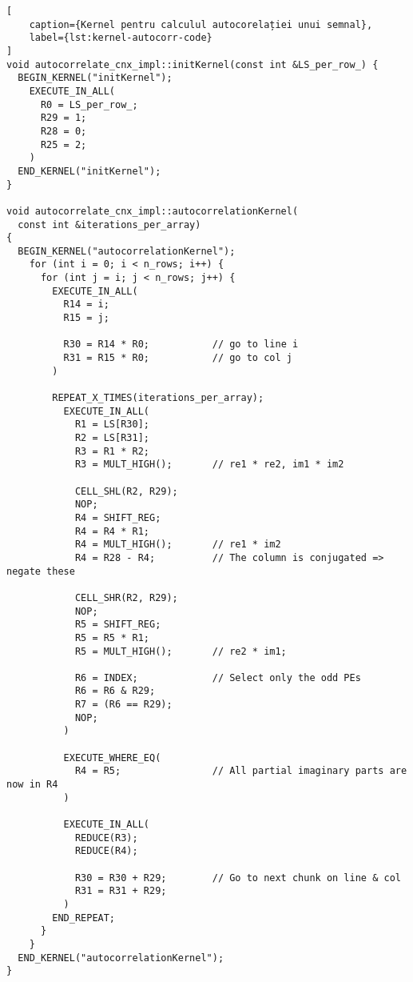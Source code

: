 \begin{lstlisting}[
    caption={Kernel pentru calculul autocorelației unui semnal},
    label={lst:kernel-autocorr-code}
]
void autocorrelate_cnx_impl::initKernel(const int &LS_per_row_) {
  BEGIN_KERNEL("initKernel");
    EXECUTE_IN_ALL(
      R0 = LS_per_row_;
      R29 = 1;
      R28 = 0;
      R25 = 2;
    )
  END_KERNEL("initKernel");
}

void autocorrelate_cnx_impl::autocorrelationKernel(
  const int &iterations_per_array)
{
  BEGIN_KERNEL("autocorrelationKernel");
    for (int i = 0; i < n_rows; i++) {
      for (int j = i; j < n_rows; j++) {
        EXECUTE_IN_ALL(
          R14 = i;
          R15 = j;

          R30 = R14 * R0;           // go to line i
          R31 = R15 * R0;           // go to col j
        )

        REPEAT_X_TIMES(iterations_per_array);
          EXECUTE_IN_ALL(
            R1 = LS[R30];
            R2 = LS[R31];
            R3 = R1 * R2;
            R3 = MULT_HIGH();       // re1 * re2, im1 * im2

            CELL_SHL(R2, R29);
            NOP;
            R4 = SHIFT_REG;
            R4 = R4 * R1;
            R4 = MULT_HIGH();       // re1 * im2
            R4 = R28 - R4;          // The column is conjugated => negate these

            CELL_SHR(R2, R29);
            NOP;
            R5 = SHIFT_REG;
            R5 = R5 * R1;
            R5 = MULT_HIGH();       // re2 * im1;

            R6 = INDEX;             // Select only the odd PEs
            R6 = R6 & R29;
            R7 = (R6 == R29);
            NOP;
          )

          EXECUTE_WHERE_EQ(
            R4 = R5;                // All partial imaginary parts are now in R4
          )

          EXECUTE_IN_ALL(
            REDUCE(R3);
            REDUCE(R4);

            R30 = R30 + R29;        // Go to next chunk on line & col
            R31 = R31 + R29;
          )
        END_REPEAT;
      }
    }
  END_KERNEL("autocorrelationKernel");
}
\end{lstlisting}

